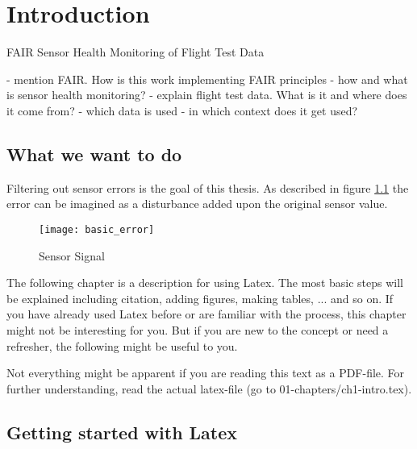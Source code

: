 \chapter{Introduction \label{ch1-intro}}


















FAIR Sensor Health Monitoring of Flight Test Data

- mention FAIR. How is this work implementing FAIR principles
- how and what is sensor health monitoring?
- explain flight test data. What is it and where does it come from?
    - which data is used
    - in which context does it get used?




\section{What we want to do}

Filtering out sensor errors is the goal of this thesis. As described in figure \ref{fig:basic_error} the error can be imagined as a disturbance added upon the original sensor value.

\begin{figure}[ht]
	\centering
	\texttt{[image: basic\_error]}
	\caption{Sensor Signal}
	\label{fig:basic_error}
\end{figure}




The following chapter is a description for using Latex. The most basic steps will be explained including citation, adding figures, making tables, ... and so on. If you have already used Latex before or are familiar with the process, this chapter might not be interesting for you. But if you are new to the concept or need a refresher, the following might be useful to you.

Not everything might be apparent if you are reading this text as a PDF-file. For further understanding, read the actual latex-file (go to 01-chapters/ch1-intro.tex).

\section{Getting started with Latex}


